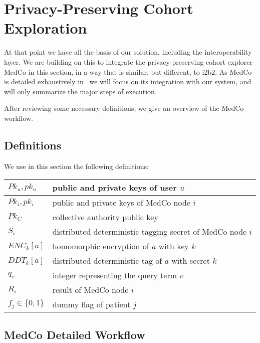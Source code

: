 \chapter{Privacy-Preserving Cohort Exploration}
\label{sec:medco}

At that point we have all the basis of our solution, including the interoperability layer.
We are building on this to integrate the privacy-preserving cohort explorer MedCo in this section, in a way that is similar, but different, to i2b2.
As MedCo is detailed exhaustively in~\cite{todo} we will focus on its integration with our system, and will only summarize the major steps of execution.

After reviewing some necessary definitions, we give an overview of the MedCo workflow.





\section{Definitions}

We use in this section the following definitions:

\begin{center}
\begin{tabular}{|l|l|}
\hline
$Pk_u, pk_u$ & public and private keys of user $u$ \\\hline
$Pk_i, pk_i$ & public and private keys of MedCo node $i$ \\\hline
$Pk_C$ & collective authority public key \\\hline
$S_i$ & distributed deterministic tagging secret of MedCo node $i$ \\\hline
$ENC_k[a]$ & homomorphic encryption of $a$ with key $k$ \\\hline
$DDT_k[a]$ & distributed deterministic tag of $a$ with secret $k$ \\\hline
$q_v$ & integer representing the query term $v$ \\\hline
$R_i$ & result of MedCo node $i$ \\\hline
$f_j \in \{0, 1\}$ & dummy flag of patient $j$ \\\hline
\end{tabular}
\end{center}


\section{MedCo Detailed Workflow}

